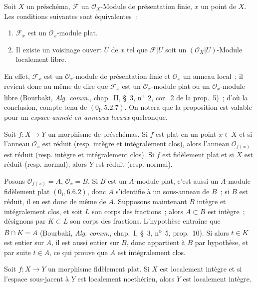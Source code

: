 \begin{proposition}[2.1.12]
\label{IV.2.1.12-fr}
Soit $X$ un préschéma, $\mathscr F$ un $\mathcal O_X$-Module de présentation
finie, $x$ un point de $X$. Les conditions suivantes sont équivalentes~:
\begin{enumerate}
\item[\emph{a)}] $\mathscr F_x$ est un $\mathcal O_x$-module plat.
\item[\emph{b)}] Il existe un voisinage ouvert $U$ de $x$ tel que
$\mathscr F|U$ soit un $(\mathcal O_X|U)$-Module localement libre.
\end{enumerate}
\end{proposition}

En effet, $\mathscr F_x$ est un $\mathcal O_x$-module de présentation finie
et $\mathcal O_x$ un anneau local~; il revient donc au même de dire que
$\mathscr F_x$ est un $\mathcal O_x$-module plat ou un $\mathcal O_x$-module
libre (Bourbaki, \emph{Alg. comm.}, chap.~II, \S~3,
n\textsuperscript{o}~2, cor.~2 de la prop.~5)~; d'où la conclusion, compte
tenu de $(0_{\mathrm I},5.2.7)$. On notera que la proposition est valable pour
un \emph{espace annelé en anneaux locaux} quelconque.

\begin{proposition}[2.1.13]
\label{IV.2.1.13-fr}
Soit $f:X\to Y$ un morphisme de préschémas. Si $f$ est plat en un point
$x\in X$ et si l'anneau $\mathcal O_x$ est réduit (resp. intègre et
intégralement clos), alors l'anneau $\mathcal O_{f(x)}$
est réduit (resp. intègre et intégralement clos). Si $f$ est fidèlement plat
et si $X$ est réduit (resp. normal), alors $Y$ est réduit (resp. normal).
\end{proposition}

Posons $\mathcal O_{f(x)}=A$, $\mathcal O_x=B$. Si $B$ est un $A$-module
plat, c'est aussi un $A$-module fidèlement plat $(0_{\mathrm I},6.6.2)$, donc
$A$ s'identifie à un sous-anneau de $B$~; si $B$ est réduit, il en est donc de
même de $A$. Supposons maintenant $B$ intègre et intégralement clos, et soit
$L$ son corps des fractions~; alors $A\subset B$ est intègre~; désignons par
$K\subset L$ son corps des fractions. L'hypothèse entraîne que
$B\cap K=A$ (Bourbaki, \emph{Alg. comm.}, chap.~I, \S~3,
n\textsuperscript{o}~5, prop.~10). Si alors $t\in K$ est entier sur $A$, il
est aussi entier sur $B$, donc appartient à $B$ par hypothèse, et par suite
$t\in A$, ce qui prouve que $A$ est intégralement clos.

\begin{proposition}[2.1.14]
\label{IV.2.1.14-fr}
Soit $f:X\to Y$ un morphisme fidèlement plat. Si $X$ est localement intègre
et si l'espace sous-jacent à $Y$ est localement noethérien, alors $Y$ est
localement intègre.
\end{proposition}

